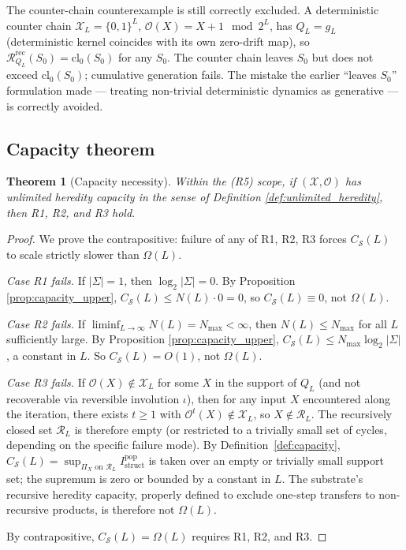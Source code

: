\documentclass[11pt]{article}
\theoremstyle{plain}
\newtheorem{theorem}{Theorem}
\theoremstyle{definition}
\newcommand{\Istructpop}{I_{\mathrm{struct}}^{\mathrm{pop}}}
\newcommand{\Csub}{C_{\mathcal{S}}}
\newcommand{\Xset}{\mathcal{X}}
\newcommand{\Op}{\mathcal{O}}
\newcommand{\Reach}{\mathcal{R}}
\begin{document}
The counter-chain counterexample is still correctly excluded. A deterministic counter chain $\Xset_L = \{0,1\}^L$, $\Op(X) = X+1 \mod 2^L$, has $Q_L = g_L$ (deterministic kernel coincides with its own zero-drift map), so $\Reach_{Q_L}^{\mathrm{rec}}(S_0) = \mathrm{cl}_0(S_0)$ for any $S_0$. The counter chain leaves $S_0$ but does not exceed $\mathrm{cl}_0(S_0)$; cumulative generation fails. The mistake the earlier ``leaves $S_0$'' formulation made --- treating non-trivial deterministic dynamics as generative --- is correctly avoided.

\subsection{Capacity theorem}
\label{subsec:capacity_thm}

\begin{theorem}[Capacity necessity]
\label{thm:supp_capacity}
Within the (R5) scope, if $(\Xset, \Op)$ has unlimited heredity capacity in the sense of Definition \ref{def:unlimited_heredity}, then R1, R2, and R3 hold.
\end{theorem}

\begin{proof}
We prove the contrapositive: failure of any of R1, R2, R3 forces $\Csub(L)$ to scale strictly slower than $\Omega(L)$.

\emph{Case R1 fails.} If $|\Sigma| = 1$, then $\log_2 |\Sigma| = 0$. By Proposition \ref{prop:capacity_upper}, $\Csub(L) \le N(L) \cdot 0 = 0$, so $\Csub(L) \equiv 0$, not $\Omega(L)$.

\emph{Case R2 fails.} If $\liminf_{L \to \infty} N(L) = N_{\max} < \infty$, then $N(L) \le N_{\max}$ for all $L$ sufficiently large. By Proposition \ref{prop:capacity_upper}, $\Csub(L) \le N_{\max} \log_2 |\Sigma|$, a constant in $L$. So $\Csub(L) = O(1)$, not $\Omega(L)$.

\emph{Case R3 fails.} If $\Op(X) \notin \Xset_L$ for some $X$ in the support of $Q_L$ (and not recoverable via reversible involution $\iota$), then for any input $X$ encountered along the iteration, there exists $t \ge 1$ with $\Op^t(X) \notin \Xset_L$, so $X \notin \mathcal{R}_L$. The recursively closed set $\mathcal{R}_L$ is therefore empty (or restricted to a trivially small set of cycles, depending on the specific failure mode). By Definition~\ref{def:capacity}, $\Csub(L) = \sup_{\Pi_X \text{ on } \mathcal{R}_L} \Istructpop$ is taken over an empty or trivially small support set; the supremum is zero or bounded by a constant in $L$. The substrate's recursive heredity capacity, properly defined to exclude one-step transfers to non-recursive products, is therefore not $\Omega(L)$.

By contrapositive, $\Csub(L) = \Omega(L)$ requires R1, R2, and R3.
\end{proof}
\end{document}
